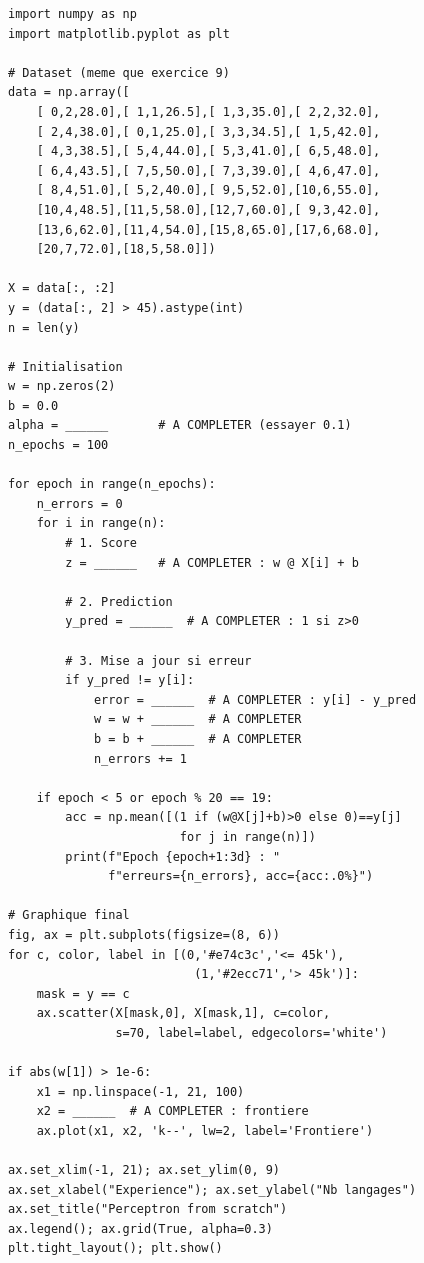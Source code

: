 \begin{pythonbox}
\begin{lstlisting}
import numpy as np
import matplotlib.pyplot as plt

# Dataset (meme que exercice 9)
data = np.array([
    [ 0,2,28.0],[ 1,1,26.5],[ 1,3,35.0],[ 2,2,32.0],
    [ 2,4,38.0],[ 0,1,25.0],[ 3,3,34.5],[ 1,5,42.0],
    [ 4,3,38.5],[ 5,4,44.0],[ 5,3,41.0],[ 6,5,48.0],
    [ 6,4,43.5],[ 7,5,50.0],[ 7,3,39.0],[ 4,6,47.0],
    [ 8,4,51.0],[ 5,2,40.0],[ 9,5,52.0],[10,6,55.0],
    [10,4,48.5],[11,5,58.0],[12,7,60.0],[ 9,3,42.0],
    [13,6,62.0],[11,4,54.0],[15,8,65.0],[17,6,68.0],
    [20,7,72.0],[18,5,58.0]])

X = data[:, :2]
y = (data[:, 2] > 45).astype(int)
n = len(y)

# Initialisation
w = np.zeros(2)
b = 0.0
alpha = ______       # A COMPLETER (essayer 0.1)
n_epochs = 100

for epoch in range(n_epochs):
    n_errors = 0
    for i in range(n):
        # 1. Score
        z = ______   # A COMPLETER : w @ X[i] + b

        # 2. Prediction
        y_pred = ______  # A COMPLETER : 1 si z>0

        # 3. Mise a jour si erreur
        if y_pred != y[i]:
            error = ______  # A COMPLETER : y[i] - y_pred
            w = w + ______  # A COMPLETER
            b = b + ______  # A COMPLETER
            n_errors += 1

    if epoch < 5 or epoch % 20 == 19:
        acc = np.mean([(1 if (w@X[j]+b)>0 else 0)==y[j]
                        for j in range(n)])
        print(f"Epoch {epoch+1:3d} : "
              f"erreurs={n_errors}, acc={acc:.0%}")

# Graphique final
fig, ax = plt.subplots(figsize=(8, 6))
for c, color, label in [(0,'#e74c3c','<= 45k'),
                          (1,'#2ecc71','> 45k')]:
    mask = y == c
    ax.scatter(X[mask,0], X[mask,1], c=color,
               s=70, label=label, edgecolors='white')

if abs(w[1]) > 1e-6:
    x1 = np.linspace(-1, 21, 100)
    x2 = ______  # A COMPLETER : frontiere
    ax.plot(x1, x2, 'k--', lw=2, label='Frontiere')

ax.set_xlim(-1, 21); ax.set_ylim(0, 9)
ax.set_xlabel("Experience"); ax.set_ylabel("Nb langages")
ax.set_title("Perceptron from scratch")
ax.legend(); ax.grid(True, alpha=0.3)
plt.tight_layout(); plt.show()
\end{lstlisting}
\end{pythonbox}

